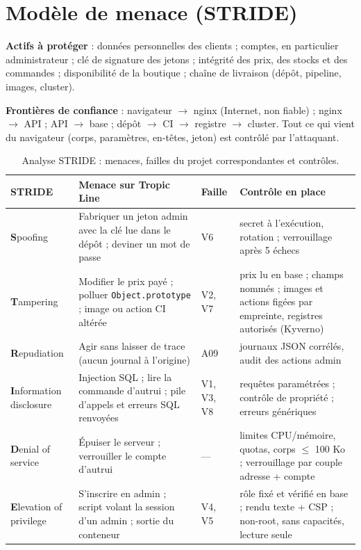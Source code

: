 \documentclass[11pt,a4paper]{article}
\newcommand{\code}[1]{\texttt{\small #1}}
\begin{document}
\section{Modèle de menace (STRIDE)}

\textbf{Actifs à protéger} : données personnelles des clients ; comptes, en particulier administrateur ;
clé de signature des jetons ; intégrité des prix, des stocks et des commandes ; disponibilité de la
boutique ; chaîne de livraison (dépôt, pipeline, images, cluster).

\textbf{Frontières de confiance} : navigateur $\rightarrow$ nginx (Internet, non fiable) ; nginx
$\rightarrow$ API ; API $\rightarrow$ base ; dépôt $\rightarrow$ CI $\rightarrow$ registre
$\rightarrow$ cluster. Tout ce qui vient du navigateur (corps, paramètres, en-têtes, jeton) est contrôlé
par l'attaquant.

\begin{table}[H]
\small
\begin{tabularx}{\linewidth}{@{}L{2.1cm}YL{1.1cm}Y@{}}
\toprule
\textbf{STRIDE} & \textbf{Menace sur Tropic Line} & \textbf{Faille} & \textbf{Contrôle en place} \\
\midrule
\textbf{S}poofing & Fabriquer un jeton admin avec la clé lue dans le dépôt ; deviner un mot de passe & V6 & secret à l'exécution, rotation ; verrouillage après 5 échecs \\
\textbf{T}ampering & Modifier le prix payé ; polluer \code{Object.prototype} ; image ou action CI altérée & V2, V7 & prix lu en base ; champs nommés ; images et actions figées par empreinte, registres autorisés (Kyverno) \\
\textbf{R}epudiation & Agir sans laisser de trace (aucun journal à l'origine) & A09 & journaux JSON corrélés, audit des actions admin \\
\textbf{I}nformation disclosure & Injection SQL ; lire la commande d'autrui ; pile d'appels et erreurs SQL renvoyées & V1, V3, V8 & requêtes paramétrées ; contrôle de propriété ; erreurs génériques \\
\textbf{D}enial of service & Épuiser le serveur ; verrouiller le compte d'autrui & --- & limites CPU/mémoire, quotas, corps $\leq$ 100 Ko ; verrouillage par couple adresse + compte \\
\textbf{E}levation of privilege & S'inscrire en admin ; script volant la session d'un admin ; sortie du conteneur & V4, V5 & rôle fixé et vérifié en base ; rendu texte + CSP ; non-root, sans capacités, lecture seule \\
\bottomrule
\end{tabularx}
\caption{Analyse STRIDE : menaces, failles du projet correspondantes et contrôles.}
\end{table}
\end{document}
